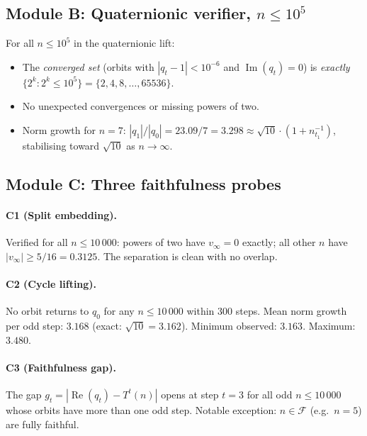 \documentclass[12pt,reqno]{amsart}
\theoremstyle{plain}
\theoremstyle{definition}
\theoremstyle{remark}
\newcommand{\abs}[1]{\left|#1\right|}
\begin{document}
\subsection{Module B: Quaternionic verifier, \texorpdfstring{$n \leq 10^5$}{n <= 10\textasciicircum 5}}

For all $n \leq 10^5$ in the quaternionic lift:
\begin{itemize}
  \item The \emph{converged set} (orbits with $\abs{q_t - 1} < 10^{-6}$
    and $\operatorname{Im}(q_t) = 0$) is \emph{exactly}
    $\{2^k : 2^k \leq 10^5\} = \{2, 4, 8, \ldots, 65536\}$.
  \item No unexpected convergences or missing powers of two.
  \item Norm growth for $n = 7$: $\abs{q_1}/\abs{q_0} = 23.09/7
    = 3.298 \approx \sqrt{10} \cdot (1 + n_{t_1}^{-1})$, stabilising
    toward $\sqrt{10}$ as $n \to \infty$.
\end{itemize}

\subsection{Module C: Three faithfulness probes}

\paragraph{C1 (Split embedding).}
Verified for all $n \leq 10\,000$: powers of two have $v_\infty = 0$
exactly; all other $n$ have $\abs{v_\infty} \geq 5/16 = 0.3125$.
The separation is clean with no overlap.

\paragraph{C2 (Cycle lifting).}
No orbit returns to $q_0$ for any $n \leq 10\,000$ within $300$ steps.
Mean norm growth per odd step: $3.168$ (exact: $\sqrt{10} = 3.162$).
Minimum observed: $3.163$.  Maximum: $3.480$.

\paragraph{C3 (Faithfulness gap).}
The gap $g_t = |\operatorname{Re}(q_t) - T^t(n)|$ opens at step $t = 3$
for all odd $n \leq 10\,000$ whose orbits have more than one odd step.
Notable exception: $n \in \mathcal{F}$ (e.g.\ $n = 5$) are fully faithful.

\end{document}
